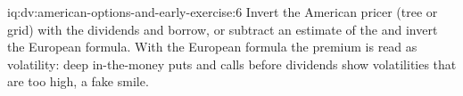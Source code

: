 \begin{solution}{iq:dv:american-options-and-early-exercise:6}
Invert the American pricer (tree or grid) with the dividends and borrow, or subtract an
estimate of the  and invert the European formula. With the European
formula the premium is read as volatility: deep in-the-money puts and calls before
dividends show volatilities that are too high, a fake smile.
\end{solution}
